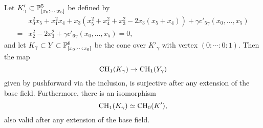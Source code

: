 \begin{lemma}
\label{lem:Y2Specialization}
  Let $K'_\gamma \subset \P^5_{[x_0:\dots:x_5]}$ be defined by
\begin{align*}
  &x_0^2x_5 + x_1^2x_4 + x_3\left(x_5^2 + x_4^2 + x_3^2 - 2x_3(x_5 + x_4)\right)+ \gamma c'_{5\gamma}(x_0,\dots,x_5) \\
=&x_2^2 - 2x_3^2 + \gamma c'_{6\gamma}(x_0,\dots,x_5)=0,
\end{align*}
and let $K_\gamma \subset Y \subset \P^6_{[x_0:\dots:x_6]}$ be the cone over $K'_{\gamma}$ with vertex $(0:\cdots:0:1)$. Then the map
\begin{equation}
  \label{eq:Y2Surjective}
  \CH_1(K_\gamma) \to \CH_1(Y_\gamma)
\end{equation}
given by pushforward via the inclusion, is surjective after any extension of the base field. Furthermore, there is an isomorphism 
\[\CH_1(K_\gamma) \simeq \CH_0(K'), \]
also valid after any extension of the base field.
\end{lemma}
